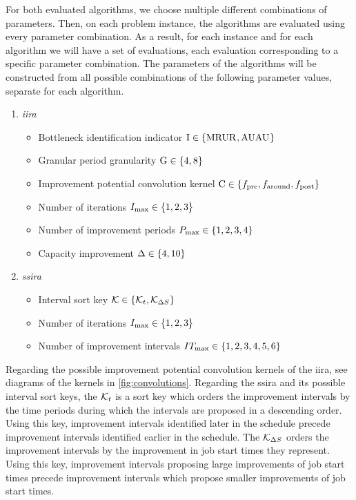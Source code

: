 For both evaluated algorithms, we choose multiple different combinations of parameters.
Then, on each problem instance, the algorithms are evaluated using every parameter combination.
As a result, for each instance and for each algorithm we will have a set of evaluations,
each evaluation corresponding to a specific parameter combination.
The parameters of the algorithms will be constructed from all possible combinations
of the following parameter values, separate for each algorithm.
\begin{enumerate}[label=(\roman*)]
    \item \emph{\acl{iira}}
        \begin{itemize}
            \item Bottleneck identification indicator $\mathrm{I} \in \{ \operatorname{MRUR}_{}, \operatorname{AUAU}_{} \}$
            \item Granular period granularity $\mathrm{G} \in \{ 4, 8 \}$
            \item Improvement potential convolution kernel $\mathrm{C} \in \{ f_{\text{pre}}, f_{\text{around}}, f_{\text{post}} \}$
            \item Number of iterations $I_{\max} \in \{ 1, 2, 3 \}$
            \item Number of improvement periods $P_{\max} \in \{ 1, 2, 3, 4 \}$
            \item Capacity improvement $\Delta \in \{ 4, 10 \}$
        \end{itemize}

    \item {\emph{\acl{ssira}}}
        \begin{itemize}
            \item Interval sort key $\mathcal{K} \in \{ \mathcal{K}_{t}, \mathcal{K}_{\Delta S_{}} \}$
            \item Number of iterations $I_{\max} \in \{ 1, 2, 3 \}$
            \item Number of improvement intervals $IT_{\max} \in \{ 1, 2, 3, 4, 5, 6 \}$
        \end{itemize}
\end{enumerate}

Regarding the possible improvement potential convolution kernels of the \ac{iira},
see diagrams of the kernels in \cref{fig:convolutions}.
Regarding the \ac{ssira} and its possible interval sort keys,
the $\mathcal{K}_{t}$ is a sort key which orders the improvement intervals
by the time periods during which the intervals are proposed in a descending order.
Using this key, improvement intervals identified later in the schedule
precede improvement intervals identified earlier in the schedule.
The $\mathcal{K}_{\Delta S_{}}$ orders the improvement intervals
by the improvement in job start times they represent.
Using this key, improvement intervals proposing large improvements of job start times
precede improvement intervals which propose smaller improvements of job start times.

